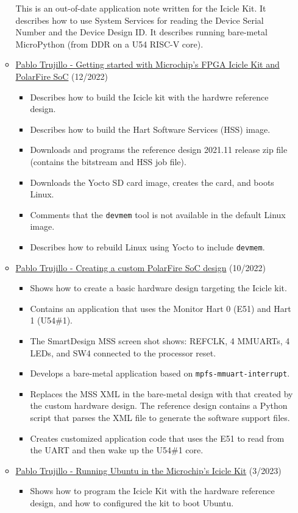 \begin{itemize}
\begin{itemize}
This is an out-of-date application note written for the Icicle Kit. It describes
how to use System Services for reading the Device Serial Number and the Device Design ID.
It describes running bare-metal MicroPython (from DDR on a U54 RISC-V core).
%
\item
\href{https://www.controlpaths.com/2021/12/20/getting-started-with-microchips-fpga-icicle-kit-and-polarfire-soc}
{Pablo Trujillo - Getting started with Microchip's FPGA Icicle Kit and PolarFire SoC} (12/2022)
%
\begin{itemize}
\item Describes how to build the Icicle kit with the hardwre reference design.
\item Describes how to build the Hart Software Services (HSS) image.
\item Downloads and programs the reference design 2021.11 release zip file\newline
(contains the bitstream and HSS job file).
\item Downloads the Yocto SD card image, creates the card, and boots Linux.
\item Comments that the \verb+devmem+ tool is not available in the default Linux image.
\item Describes how to rebuild Linux using Yocto to include \verb+devmem+.
\end{itemize}
%
\item
\href{https://www.controlpaths.com/2022/10/10/creating-a-custom-polarfire-soc-design}
{Pablo Trujillo - Creating a custom PolarFire SoC design} (10/2022)
%
\begin{itemize}
\item
Shows how to create a basic hardware design targeting the Icicle kit.
\item
Contains an application that uses the Monitor Hart 0 (E51) and Hart 1 (U54\#1).
\item
The SmartDesign MSS screen shot shows: REFCLK, 4 MMUARTs, 4 LEDs, and SW4 connected
to the processor reset.
\item
Develops a bare-metal application based on \verb+mpfs-mmuart-interrupt+.
\item
Replaces the MSS XML in the bare-metal design with that created by the custom hardware design.
The reference design contains a Python script that parses the XML file to generate the
software support files.
\item
Creates customized application code that uses the E51 to read from the UART and then wake up the U54\#1 core.
\end{itemize}
%
\item
\href{https://www.controlpaths.com/2023/03/26/running-ubuntu-in-the-icicle-kit}
{Pablo Trujillo - Running Ubuntu in the Microchip's Icicle Kit} (3/2023)
%
\begin{itemize}
\item
Shows how to program the Icicle Kit with the hardware reference design, and how
to configured the kit to boot Ubuntu.
\end{itemize}
%
\end{itemize}

\end{itemize}




